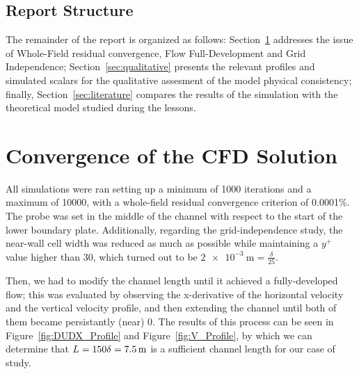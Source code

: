 \documentclass[12pt]{article}
\begin{document}
        \subsection{Report Structure}

                The remainder of the report is organized as follows: Section~\ref{sec:convergence} addresses the issue of Whole-Field residual convergence, Flow Full-Development and Grid Independence; Section~\ref{sec:qualitative} presents the relevant profiles and simulated scalars for the qualitative assesment of the model physical consistency; finally, Section~\ref{sec:literature} compares the results of the simulation with the theoretical model studied during the lessons.

\section{Convergence of the CFD Solution} \label{sec:convergence}

        All simulations were ran setting up a minimum of 1000 iterations and a maximum of 10000, with a whole-field residual convergence criterion of 0.0001\%. The probe was set in the middle of the channel with respect to the start of the lower boundary plate. Additionally, regarding the grid-independence study, the near-wall cell width was reduced as much as possible while maintaining a \( y^+ \) value higher than 30, which turned out to be \( \SI{2e-3}{\metre} = \frac{\delta}{25} \).

        Then, we had to modify the channel length until it achieved a fully-developed flow; this was evaluated by observing the x-derivative of the horizontal velocity and the vertical velocity profile, and then extending the channel until both of them became persistantly (near) 0. The results of this process can be seen in Figure~\ref{fig:DUDX_Profile} and Figure~\ref{fig:V_Profile}, by which we can determine that $ L = 150 \delta =  \SI{7.5E0}{\metre}$ is a sufficient channel length for our case of study.
\end{document}
